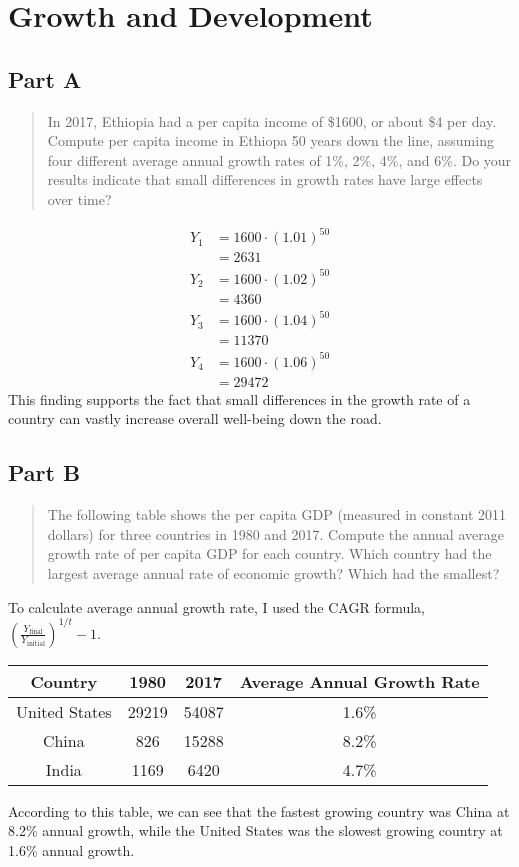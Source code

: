 \documentclass[8pt]{extarticle}
\title{}
\author{Avinash Iyer}
\date{}
\begin{document}
\section*{Growth and Development}%
\subsection*{Part A}
  \begin{quote}
    In 2017, Ethiopia had a per capita income of \$1600, or about \$4 per day. Compute per capita income in Ethiopa 50 years down the line, assuming four different average annual growth rates of 1\%, 2\%, 4\%, and 6\%. Do your results indicate that small differences in growth rates have large effects over time?
  \end{quote}
    \begin{align*}
      Y_{1} &= 1600\cdot (1.01)^{50} \\
          &= 2631 \\
      Y_{2} &= 1600 \cdot (1.02)^{50} \\
          &= 4360\\
      Y_{3} &= 1600\cdot (1.04)^{50}\\
          &= 11370\\
      Y_{4} &= 1600 \cdot (1.06)^{50} \\
          &= 29472
    \end{align*}
  This finding supports the fact that small differences in the growth rate of a country can vastly increase overall well-being down the road.
  \subsection*{Part B}%
    \begin{quote}
      The following table shows the per capita GDP (measured in constant 2011 dollars) for three countries in 1980 and 2017. Compute the annual average growth rate of per capita GDP for each country. Which country had the largest average annual rate of economic growth? Which had the smallest?
    \end{quote}
To calculate average annual growth rate, I used the CAGR formula, $\left(\frac{Y_{\textrm{final}}}{Y_{\textrm{initial}}}\right)^{1/t}-1$.
    \begin{center}
      \begin{tabular}{c|cc|c}
        Country & 1980 & 2017 & Average Annual Growth Rate\\
        \hline
        United States & 29219 & 54087 & 1.6\%\\
        China & 826 & 15288 & 8.2\% \\
        India & 1169 & 6420 & 4.7\%
      \end{tabular}
    \end{center}
    According to this table, we can see that the fastest growing country was China at 8.2\% annual growth, while the United States was the slowest growing country at 1.6\% annual growth.
\end{document}
